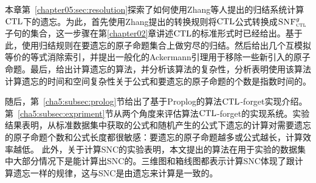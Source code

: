 本章第~\ref{chapter05:sec:resolution}探索了如何使用Zhang等人提出的归结系统计算$\textrm{CTL}$下的遗忘。为此，首先使用Zhang提出的转换规则将$\textrm{CTL}$公式转换成${\textsc{SNF}_{\textsc{ctl}}^g}$子句的集合，这一步骤在第\ref{chapter02}章讲述$\textrm{CTL}$的标准形式时已经给出。基于此，使用归结规则在要遗忘的原子命题集合上做穷尽的归结。然后给出几个互模拟等价的等式消除索引，并提出一般化的Ackermann引理用于移除一些新引入的原子命题。最后，给出计算遗忘的算法，并分析该算法的复杂性，分析表明使用该算法计算遗忘的时间和空间复杂性关于公式和要遗忘的原子命题的个数是指数时间的。


随后，第~\ref{cha5:subsec:prolog}节给出了基于Proplog的算法$\textrm{CTL}$-forget实现介绍。第~\ref{cha5:subsec:expriment}节从两个角度来评估算法$\textrm{CTL}$-forget的实现系统。实验结果表明，从标准数据集中获取的公式和随机产生的公式下遗忘的计算对需要遗忘的原子命题个数和公式长度都很敏感：要遗忘的原子命题越多或公式越长，计算效率越低。
此外，关于计算SNC的实验表明，本文提出的算法在用于实验的数据集中大部分情况下是能计算出SNC的。三维图和箱线图都表示计算SNC体现了跟计算遗忘一样的规律，这与SNC是由遗忘来计算是一致的。
